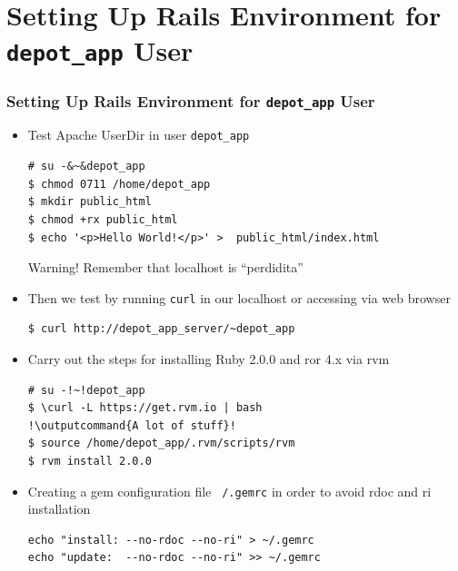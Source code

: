 \documentclass{beamer}
\newcommand{\outputcommand}[1]{\color{darkgreen}{#1}}
\begin{document}
\section{Setting Up Rails Environment for \texttt{depot\_app} User}
\begin{frame}
\frametitle{Setting Up Rails Environment for \texttt{depot\_app} User}
\begin{itemize}

\item Test Apache UserDir in user \texttt{depot\_app}
\lstset{language=shell, escapechar=!}
\begin{lstlisting}[escapechar=&]
# su -&~&depot_app
$ chmod 0711 /home/depot_app
$ mkdir public_html
$ chmod +rx public_html
$ echo '<p>Hello World!</p>' >  public_html/index.html
\end{lstlisting}

\begin{block}{Warning!}
  Remember that localhost is ``perdidita''
\end{block}
\item Then we test by running \texttt{curl} in our \alert{localhost} or accessing via web browser

\begin{lstlisting}[escapechar=&]
$ curl http://depot_app_server/~depot_app
\end{lstlisting}

\item Carry out the steps for installing Ruby 2.0.0 and \acrshort{ror} 4.x via \acrshort{rvm}

\lstset{language=shell, escapechar=!}
\begin{lstlisting}[escapechar=!]
# su -!~!depot_app
$ \curl -L https://get.rvm.io | bash
!\outputcommand{A lot of stuff}!
$ source /home/depot_app/.rvm/scripts/rvm
$ rvm install 2.0.0
\end{lstlisting}

\item Creating a gem configuration file \texttt{~/.gemrc} in order to avoid rdoc and ri installation

\lstset{language=shell, escapechar=!}
\begin{lstlisting}[escapechar=!]
echo "install: --no-rdoc --no-ri" > ~/.gemrc
echo "update:  --no-rdoc --no-ri" >> ~/.gemrc
\end{lstlisting}
\end{itemize}
\end{frame}
\end{document}
